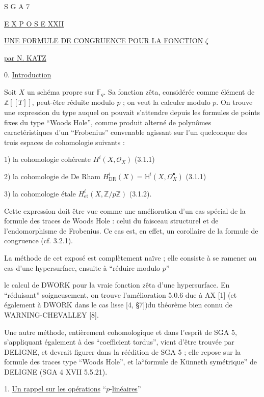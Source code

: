
S G A  7


\underline{E X P O S E  XXII}


\underline{\underline{UNE FORMULE DE CONGRUENCE POUR LA FONCTION}} $\zeta$

\underline{par N. KATZ}


0. \underline{Introduction}

Soit $X$ un schéma propre sur $\mathbb F_q$. Sa fonction zêta, considérée
comme élément de $\mathbb Z[[T]]$, peut-être réduite modulo $p$ ; on veut la
calculer modulo $p$. On trouve une expression du type auquel on pouvait
s'attendre depuis les formules de points fixes du type ``Woods Hole'', comme
produit alterné de polynômes caractéristiques d'un ``Frobenius'' convenable
agissant sur l'un quelconque des trois espaces de cohomologie suivants :

1) la cohomologie cohérente $H^i(X,\mathcal O_X)$ (3.1.1)

2) la cohomologie de De Rham
$H^i_{\mathrm{DR}}(X)=\mathbb H^i(X,\Omega_X^\bullet)$ (3.1.1)

3) la cohomologie étale
$H^i_{\mathrm{et}}(X,\mathbb Z/p\mathbb Z)$ (3.1.2).

Cette expression doit être vue comme une amélioration d'un cas spécial de la
formule des traces de Woods Hole : celui du faisceau structurel et de
l'endomorphisme de Frobenius. Ce cas est, en effet, un corollaire de la
formule de congruence (cf. 3.2.1).

La méthode de cet exposé est complètement naïve ; elle consiste à se ramener
au cas d'une hypersurface, ensuite à ``réduire modulo $p$''


le calcul de DWORK pour la vraie fonction zêta d'une hypersurface. En
``réduisant'' soigneusement, on trouve l'amélioration 5.0.6 due à AX [1]
(et également à DWORK dans le cas lisse [4, \S 7])du théorème bien connu de
WARNING-CHEVALLEY [8].

Une autre méthode, entièrement cohomologique et dans l'esprit de SGA 5,
s'appliquant également à des ``coefficient tordus'', vient d'être trouvée par
DELIGNE, et devrait figurer dans la réédition de SGA 5 ; elle repose sur la
formule des traces type ``Woods Hole'', et la``formule de Künneth symétrique''
de DELIGNE (SGA 4 XVII 5.5.21).

1. \underline{Un rappel sur les opérations} ``$p$-\underline{linéaires}''

